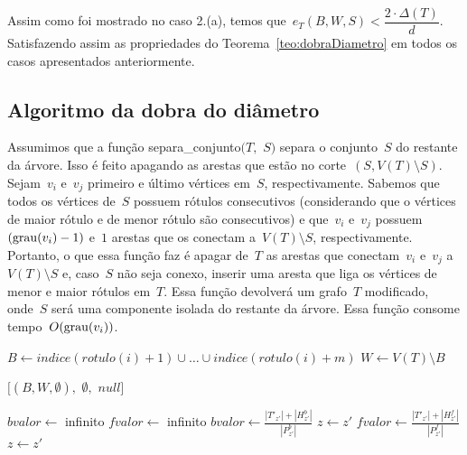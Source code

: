 	Assim como foi mostrado no caso 2.(a), temos 
	que~${e_T(B,W,S)<\dfrac{2\cdot \Delta(T)}{d}}$.
	Satisfazendo assim as propriedades do Teorema~\ref{teo:dobraDiametro} em todos os casos apresentados anteriormente.

	


	\bigskip
	\bigskip
	\bigskip

	\subsection{Algoritmo da dobra do diâmetro}

		Assumimos que a função {\sc separa\_conjunto}$(T,$ $S)$
		separa o conjunto~$S$ do restante da árvore.
		Isso é feito apagando as arestas que estão no 
		corte~$(S,V(T)\setminus S)$.
		Sejam~$v_i$ e~$v_j$ primeiro e último vértices em~$S$, respectivamente.
		Sabemos que todos os vértices de~$S$ possuem
		rótulos consecutivos (considerando que o vértices de maior rótulo e 
		de menor rótulo são consecutivos) e que~$v_i$ e~$v_j$ possuem~${(\mathrm{grau}(v_i)-1)}$
		e~$1$ arestas que os conectam a~$V(T)\setminus S$, respectivamente.
		Portanto, o que essa função faz é apagar de~$T$ as arestas que 
		conectam~$v_i$ e~$v_j$ a~$V(T)\setminus S$ e, caso~$S$ não seja
		conexo, inserir uma aresta que liga os vértices de menor e maior rótulos em~$T$.
		Essa função devolverá um grafo~$T$ modificado, onde~$S$ será uma componente
		isolada do restante da árvore. 
		Essa função consome tempo~$O(\mathrm{grau}(v_i))$.

	\begin{algorithm}[H]
	\label{alg:dobraDiametro}

		\caption{}
		{
			{
				$B\gets indice(rotulo(i)+1)\cup\ldots\cup indice(rotulo(i)+m)$\;
				$W\gets V(T)\setminus B$\;

				\Return $[(B,W,\emptyset),$ $\emptyset,$ $null]$\;
			}
		}
		$bvalor \gets$ infinito \;
		$fvalor \gets$ infinito\;
		{
			{
			 	$bvalor \gets \frac{|T'_{z'}|+|H_{z'}^b|}{|P^b_{z'}|}$\;
			 	$z \gets z'$\; 
			}
		}
		{
			{
			 	$fvalor \gets \frac{|T'_{z'}|+|H_{z'}^f|}{|P^f_{z'}|}$\;
			 	$z \gets z'$\; 
			}
		}
	\end{algorithm}	

